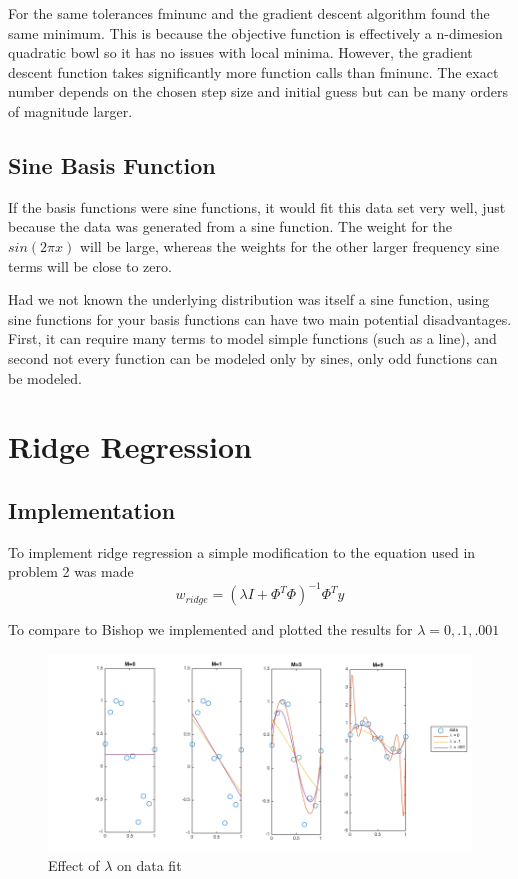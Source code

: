 \documentclass[10pt,twocolumn]{article}
\begin{document}
For the same tolerances fminunc and the gradient descent algorithm found the same minimum. This is because the objective function is effectively a n-dimesion quadratic bowl so it has no issues with local minima. However, the gradient descent function takes significantly more function calls than fminunc. The exact number depends on the chosen step size and initial guess but can be many orders of magnitude larger. 

\subsection*{ Sine Basis Function}
If the basis functions were sine functions, it would fit this data set very well, just because the data was generated from a sine function. The weight for the $sin(2 \pi x)$ will be large, whereas the weights for the other larger frequency sine terms will be close to zero.

Had we not known the underlying distribution was itself a sine function, using sine functions for your basis functions can have two main potential disadvantages. First, it can require many terms to model simple functions (such as a line), and second not every function can be modeled only by sines, only odd functions can be modeled.

\section{Ridge Regression}

\subsection*{ Implementation}

To implement ridge regression a simple modification to the equation used in problem 2 was made
\begin{equation}
w_{ridge} = (\lambda I + \Phi^T  \Phi)^{-1}  \Phi^T y
\end{equation}

To compare to Bishop we implemented and plotted the results for $\lambda = {0, .1, .001} $

\begin{figure}[H]
\center
\includegraphics[scale =.3]{rr_lambdas.png}
\caption{Effect of $\lambda$ on data fit}
\end{figure}
\end{document}

